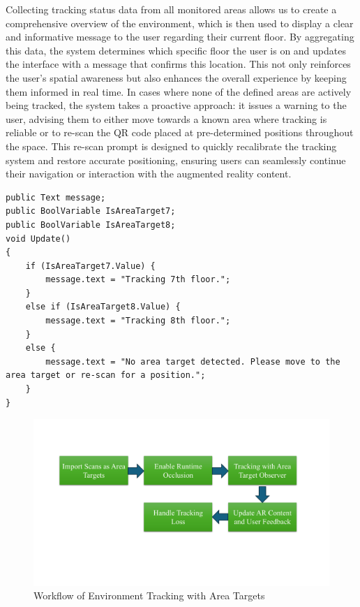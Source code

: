 Collecting tracking status data from all monitored areas allows us to create a comprehensive overview of the environment, which is then used to display a clear and informative message to the user regarding their current floor. By aggregating this data, the system determines which specific floor the user is on and updates the interface with a message that confirms this location. This not only reinforces the user’s spatial awareness but also enhances the overall experience by keeping them informed in real time. In cases where none of the defined areas are actively being tracked, the system takes a proactive approach: it issues a warning to the user, advising them to either move towards a known area where tracking is reliable or to re-scan the QR code placed at pre-determined positions throughout the space. This re-scan prompt is designed to quickly recalibrate the tracking system and restore accurate positioning, ensuring users can seamlessly continue their navigation or interaction with the augmented reality content.

\begin{lstlisting}[style=cSharp]
public Text message;
public BoolVariable IsAreaTarget7;
public BoolVariable IsAreaTarget8;
void Update()
{
    if (IsAreaTarget7.Value) {
        message.text = "Tracking 7th floor.";
    }
    else if (IsAreaTarget8.Value) {
        message.text = "Tracking 8th floor.";
    }
    else {
        message.text = "No area target detected. Please move to the area target or re-scan for a position.";
    }
}
\end{lstlisting}

\begin{figure}[ht]
  \centering
  \includegraphics[scale=0.5]{content/resources/images/chap-problems-solutions/environment-tracking-0.PNG}
  \caption{Workflow of Environment Tracking with Area Targets}
  \label{fig:environment-tracking-0}
\end{figure}
